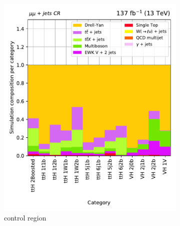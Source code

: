 \begin{figure}[htbp]
    \begin{subfigure}[b]{0.33\textwidth}
        \includegraphics[width=\textwidth]{figures/region_plots/full_Run2/region_2/background_composition.pdf}
        \caption{\doubleMuCr control region}
    \end{subfigure}
    \hspace{0.05\textwidth}
    \begin{subfigure}[b]{0.33\textwidth}

\end{subfigure}
\end{figure}
